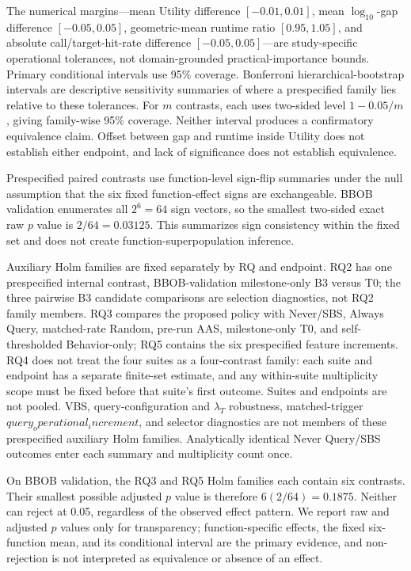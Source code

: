 The numerical margins---mean Utility difference $[-0.01,0.01]$, mean
$\log_{10}$-gap difference $[-0.05,0.05]$, geometric-mean runtime ratio
$[0.95,1.05]$, and absolute call/target-hit-rate difference $[-0.05,0.05]$---are
study-specific operational tolerances, not domain-grounded practical-importance
bounds.  Primary conditional intervals use 95\% coverage.  Bonferroni
hierarchical-bootstrap intervals are descriptive sensitivity summaries of
where a prespecified family lies relative to these tolerances.  For $m$
contrasts, each uses two-sided level $1-0.05/m$, giving family-wise 95\%
coverage.  Neither interval produces a
confirmatory equivalence claim.  Offset between gap and runtime inside Utility
does not establish either endpoint, and lack of significance does not establish
equivalence.

Prespecified paired contrasts use function-level sign-flip summaries under the
null assumption that the six fixed function-effect signs are exchangeable.
BBOB validation enumerates all $2^6=64$ sign vectors, so the smallest two-sided
exact raw $p$ value is $2/64=0.03125$.  This summarizes sign consistency within
the fixed set and does not create function-superpopulation inference.

Auxiliary Holm families are fixed separately by RQ and endpoint.  RQ2 has one
prespecified internal contrast, BBOB-validation milestone-only B3 versus T0; the three
pairwise B3 candidate comparisons are selection diagnostics, not RQ2 family
members.  RQ3 compares the proposed policy with
Never/SBS, Always Query, matched-rate Random, pre-run AAS, milestone-only T0,
and self-thresholded Behavior-only; RQ5 contains the six prespecified feature
increments.  RQ4 does not treat the four suites as a four-contrast family:
each suite and endpoint has a separate finite-set estimate, and any within-suite
multiplicity scope must be fixed before that suite's first outcome.  Suites and
endpoints are not pooled.  VBS, query-configuration and
$\lambda_T$ robustness, matched-trigger $query_operational_increment$, and selector diagnostics are not
members of these prespecified auxiliary Holm families.  Analytically identical
Never Query/SBS outcomes
enter each summary and multiplicity count once.

On BBOB validation, the RQ3 and RQ5 Holm families each contain six contrasts.
Their smallest possible adjusted $p$ value is therefore
$6(2/64)=0.1875$.  Neither can reject at 0.05, regardless of the observed
effect pattern.  We report raw and
adjusted $p$ values only for transparency; function-specific effects, the fixed
six-function mean, and its conditional interval are the primary evidence, and
non-rejection is not interpreted as equivalence or absence of an effect.
